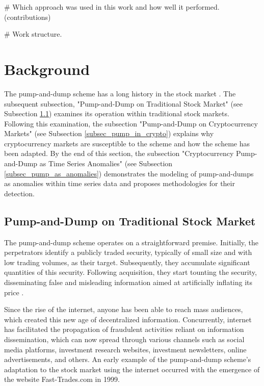 \documentclass[12pt]{article}
\begin{document}
	\# Which approach was used in this work and how well it performed. (contributions)

	\# Work structure. 
	
	\section{Background}
	\label{sec_fund_teorica}

	The pump-and-dump scheme has a long history in the stock market \citep{lamorgia2020}.
	The subsequent subsection, "Pump-and-Dump on Traditional Stock Market" (see Subsection \ref{subsec_pump_def}) examines its operation within traditional stock markets.
	Following this examination, the subsection "Pump-and-Dump on Cryptocurrency Markets" (see Subsection \ref{subsec_pump_in_crypto}) explains why cryptocurrency markets are susceptible to the scheme and how the scheme has been adapted.
	By the end of this section, the subsection "Cryptocurrency Pump-and-Dump as Time Series Anomalies" (see Subsection \ref{subsec_pump_as_anomalies}) demonstrates the modeling of pump-and-dumps as anomalies within time series data and proposes methodologies for their detection.

	\subsection{Pump-and-Dump on Traditional Stock Market}
	\label{subsec_pump_def}

	The pump-and-dump scheme operates on a straightforward premise.
	Initially, the perpetrators identify a publicly traded security, typically of small size and with low trading volumes, as their target.
	Subsequently, they accumulate significant quantities of this security.
	Following acquisition, they start tounting the security, disseminating false and misleading information aimed at artificially inflating its price \citep{kramer2005}.

	Since the rise of the internet, anyone has been able to reach mass audiences, which created this new age of decentralized information.
	Concurrently, internet has facilitated the propagation of fraudulent activities reliant on information dissemination, which can now spread through various channels such as social media platforms, investment research websites, investment newsletters, online advertisements, and others.
	An early example of the pump-and-dump scheme's adaptation to the stock market using the internet occurred with the emergence of the website Fast-Trades.com in 1999.
\end{document}
